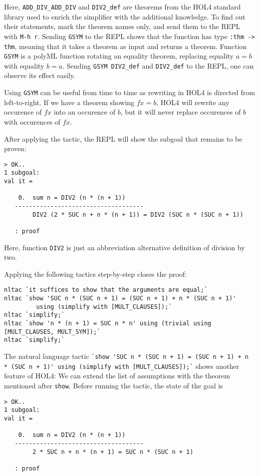 \documentclass[10pt]{scrartcl}
\newcommand{\ekey}[1]{\texttt{#1}}
\begin{document}
Here, \lstinline{ADD_DIV_ADD_DIV} and \lstinline{DIV2_def} are theorems from the
HOL4 standard library used to enrich the simplifier with the additional
knowledge.
To find out their statements, mark the theorem names only, and send them to the
REPL with \ekey{M-h r}.
Sending \lstinline{GSYM} to the REPL shows that the function has type
\lstinline{:thm -> thm}, meaning that it takes a theorem as input and returns a
theorem.
Function \lstinline{GSYM} is a polyML function rotating an equality theorem,
replacing equality $a = b$ with equality $b = a$.
Sending \lstinline{GSYM DIV2_def} and \lstinline{DIV2_def} to the REPL, one can
observe its effect easily.

Using \lstinline{GSYM} can be useful from time to time as rewriting in HOL4 is
directed from left-to-right.
If we have a theorem showing $f x = b$, HOL4 will rewrite any occurence of
$f x$ into an occurence of $b$, but it will never replace occurences of $b$
with occurences of $f x$.

After applying the tactic, the REPL will show the subgoal that remains to be proven:
\begin{lstlisting}
> OK..
1 subgoal:
val it =

    0.  sum n = DIV2 (n * (n + 1))
   ------------------------------------
        DIV2 (2 * SUC n + n * (n + 1)) = DIV2 (SUC n * (SUC n + 1))

   : proof
\end{lstlisting}

Here, function \lstinline{DIV2} is just an abbreviation alternative definition
of division by two.

Applying the following tactics step-by-step closes the proof:

\begin{lstlisting}
nltac `it suffices to show that the arguments are equal;`
nltac `show 'SUC n * (SUC n + 1) = (SUC n + 1) + n * (SUC n + 1)'
         using (simplify with [MULT_CLAUSES]);`
nltac `simplify;`
nltac `show 'n * (n + 1) = SUC n * n' using (trivial using [MULT_CLAUSES, MULT_SYM]);`
nltac `simplify;`
\end{lstlisting}

\begin{sloppypar}
The natural language tactic \lstinline{`show 'SUC n * (SUC n + 1) = (SUC n + 1) + n * (SUC n + 1)' using (simplify with [MULT_CLAUSES]);`}
shows another feature of HOL4:
We can extend the list of assumptions with the theorem mentioned after
\lstinline{show}.
Before running the tactic, the state of the goal is
\end{sloppypar}
\begin{lstlisting}
> OK..
1 subgoal:
val it =

    0.  sum n = DIV2 (n * (n + 1))
   ------------------------------------
        2 * SUC n + n * (n + 1) = SUC n * (SUC n + 1)

   : proof
\end{lstlisting}
\end{document}
